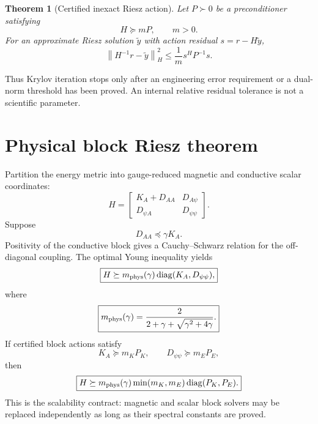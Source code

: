 \documentclass[11pt]{article}
\newtheorem{theorem}[assumption]{Theorem}
\theoremstyle{remark}
\newcommand{\norm}[1]{\left\lVert #1\right\rVert}
\newcommand{\diag}{\operatorname{diag}}
\begin{document}
\begin{theorem}[Certified inexact Riesz action]
Let \(P\succ0\) be a preconditioner satisfying
\[
H\succeq mP,
\qquad m>0.
\]
For an approximate Riesz solution \(\widetilde y\) with action residual \(s=r-H\widetilde y\),
\begin{equation}
\boxed{
\norm{H^{-1}r-\widetilde y}_H^2
\le\frac1m s^HP^{-1}s.
}
\label{eq:pcg_action_bound}
\end{equation}
\end{theorem}
Thus Krylov iteration stops only after an engineering error requirement or a dual-norm threshold has been proved. An internal relative residual tolerance is not a scientific parameter.

\section{Physical block Riesz theorem}

Partition the energy metric into gauge-reduced magnetic and conductive scalar coordinates:
\[
H=
\begin{bmatrix}
K_A+D_{AA}&D_{A\psi}\\
D_{\psi A}&D_{\psi\psi}
\end{bmatrix}.
\]
Suppose
\begin{equation}
D_{AA}\preceq\gamma K_A.
\label{eq:gamma_domination}
\end{equation}
Positivity of the conductive block gives a Cauchy--Schwarz relation for the off-diagonal coupling. The optimal Young inequality yields
\begin{equation}
\boxed{
H\succeq m_{\rm phys}(\gamma)\diag(K_A,D_{\psi\psi}),
}
\label{eq:block_bound}
\end{equation}
where
\begin{equation}
\boxed{
m_{\rm phys}(\gamma)=
\frac{2}{2+\gamma+\sqrt{\gamma^2+4\gamma}}.
}
\label{eq:mphys}
\end{equation}
If certified block actions satisfy
\[
K_A\succeq m_KP_K,
\qquad
D_{\psi\psi}\succeq m_EP_E,
\]
then
\begin{equation}
\boxed{
H\succeq
m_{\rm phys}(\gamma)\min(m_K,m_E)\diag(P_K,P_E).
}
\label{eq:block_action_bound}
\end{equation}
This is the scalability contract: magnetic and scalar block solvers may be replaced independently as long as their spectral constants are proved.
\end{document}
